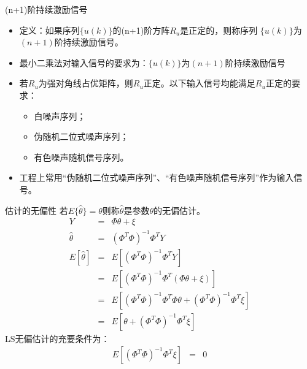 \begin{frame}{(n+1)阶持续激励信号}
\begin{itemize}
\item 定义：如果序列$\{u(k)\}$的(n+1)阶方阵$R_u$是正定的，则称序列
$\{u(k)\}$为$(n+1)$阶持续激励信号。
\item 最小二乘法对输入信号的要求为：$\{u(k)\}$为$(n+1)$阶持续激励信号
\item 若$R_u$为强对角线占优矩阵，则$R_u$正定。以下输入信号均能满足$R_u$正定的要求：
\begin{itemize}
\item 白噪声序列；
\item 伪随机二位式噪声序列；
\item 有色噪声随机信号序列。
\end{itemize}
\item 工程上常用“伪随机二位式噪声序列”、“有色噪声随机信号序列”作为输入信号。
\end{itemize}
\end{frame}


\begin{frame}{估计的无偏性}
若$E\{\hat\theta\}=\theta$则称$\hat\theta$是参数$\theta$的无偏估计。
\begin{eqnarray*}
Y &=& \Phi\theta +\xi \\
\hat\theta &=& (\Phi^T\Phi)^{-1}\Phi^T Y \\
E[\hat\theta] &=& E[(\Phi^T\Phi)^{-1}\Phi^T Y] \\
&=& E[(\Phi^T\Phi)^{-1}\Phi^T (\Phi\theta+\xi)] \\
&=& E[(\Phi^T\Phi)^{-1}\Phi^T \Phi\theta+(\Phi^T\Phi)^{-1}\Phi^T \xi] \\
&=& E[\theta+(\Phi^T\Phi)^{-1}\Phi^T \xi] 
\end{eqnarray*}
LS无偏估计的充要条件为：
\begin{eqnarray*}
 E[(\Phi^T\Phi)^{-1}\Phi^T \xi] &=& 0
\end{eqnarray*}
\end{frame}

